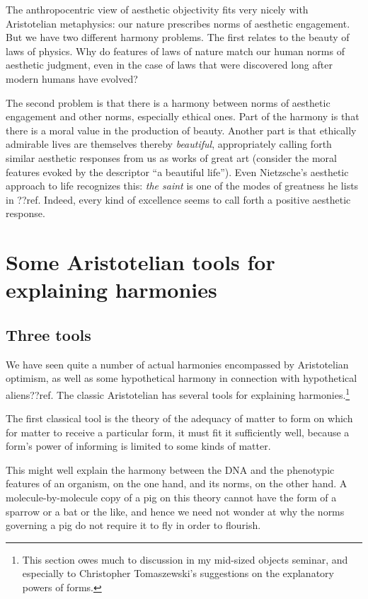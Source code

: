 The anthropocentric view of aesthetic objectivity fits very nicely with Aristotelian metaphysics: our
nature prescribes norms of aesthetic engagement. But we have two different harmony problems. The first relates
to the beauty of laws of physics. Why do features of laws of nature match our human norms of aesthetic 
judgment, even in the case of laws that were discovered long after modern humans have evolved? 

The second problem is that there is a harmony between norms of aesthetic engagement and other norms, especially 
ethical ones. Part of the harmony is that there is a moral value in the production of beauty.  Another part
is that ethically admirable lives are themselves thereby
\textit{beautiful}, appropriately calling forth similar aesthetic responses from us as works of great 
art (consider the moral features evoked by the descriptor ``a beautiful life''). 
Even Nietzsche's aesthetic approach to life recognizes this: \textit{the saint} is one of the modes of greatness
he lists in ??ref. Indeed, every kind of excellence seems to call forth a positive aesthetic response.

\section{Some Aristotelian tools for explaining harmonies}
\subsection{Three tools}
We have seen quite a number of actual harmonies encompassed by Aristotelian optimism, as well as some hypothetical 
harmony in connection with hypothetical aliens??ref. The classic Aristotelian has several tools for explaining  
harmonies.\footnote{This section owes much to discussion in my mid-sized objects seminar, and especially to 
Christopher Tomaszewski's suggestions on the explanatory powers of forms.}

The first classical tool is the theory of the adequacy of matter to form on which for matter to receive a particular 
form, it must fit it sufficiently well, because a form's power of informing is limited to some kinds of matter. 

This might well explain the harmony between the DNA and the phenotypic features of an organism, on the one hand, 
and its norms, on the other hand. A molecule-by-molecule copy of a pig on this theory cannot have the form of a sparrow or 
a bat or the like, and hence we need not wonder at why the norms governing a pig do not require it to fly in order to flourish.

